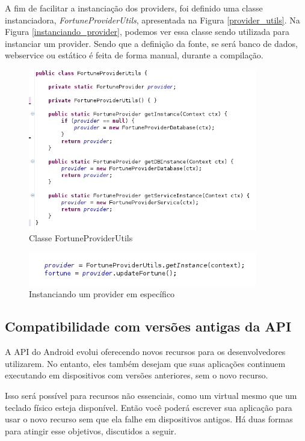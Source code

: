 A fim de facilitar a instanciação dos providers, foi definido uma classe 
instanciadora, {\it FortuneProviderUtils}, apresentada na Figura \ref{provider_utils}.
Na Figura \ref{instanciando_provider}, podemos ver essa classe sendo utilizada para 
instanciar um provider. Sendo que a definição da fonte, se será banco de dados, 
webservice ou estático é feita de forma manual, durante a compilação.

\begin{figure}[h]
    \centering
    \includegraphics[width=10cm]{img/FortuneProviderUtils}
    \caption{Classe FortuneProviderUtils}
    \label{instaciando_provider}
\end{figure}

\begin{figure}[h]
    \centering
    \includegraphics[width=10cm]{img/instaciando_provider}
    \caption{Instanciando um provider em específico}
    \label{instaciando_provider}
\end{figure}


\subsection{Compatibilidade com versões antigas da API}

A API do Android evolui oferecendo novos recursos para os desenvolvedores utilizarem.
No entanto, eles também desejam que suas aplicações continuem executando em 
dispositivos com versões anteriores, sem o novo recurso.

Isso será possível para recursos não essenciais, como um virtual mesmo que um teclado físico esteja disponível. Então você poderá escrever sua aplicação para usar o novo 
recurso sem que ela falhe em dispositivos antigos. Há duas formas para atingir esse objetivos, discutidos a seguir.

